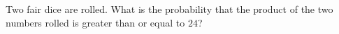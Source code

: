 Two fair dice are rolled. What is the probability that the product of the two numbers rolled is greater than or equal to $24$?
